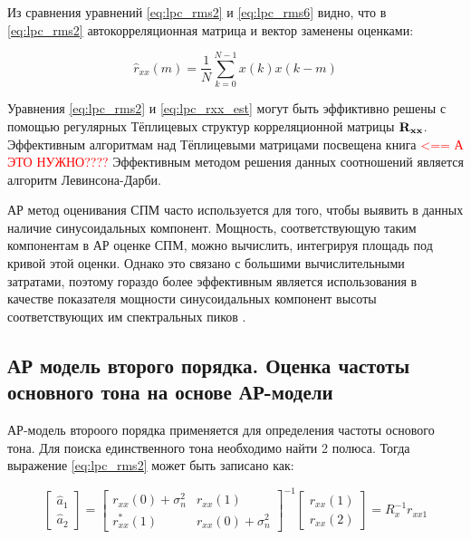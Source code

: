 Из сравнения уравнений \ref{eq:lpc_rms2} и \ref{eq:lpc_rms6} видно, что в \ref{eq:lpc_rms2}
автокорреляционная матрица и вектор заменены оценками:
\begin{center}
\begin{equation}
	\label{eq:lpc_rxx_est}
	\hat{r}_{xx}(m) = \frac{1}{N} \sum \limits_{k=0}^{N-1} x(k)x(k-m)
\end{equation}
\end{center}

Уравнения \ref{eq:lpc_rms2} и \ref{eq:lpc_rxx_est} могут быть эффиктивно решены с помощью регулярных
Тёплицевых структур корреляционной матрицы ${{\bf R_{xx}}}$. Эффективным алгоритмам над Тёплицевыми
матрицами посвещена книга \cite{bleyhut_book} \textcolor{red}{<== А ЭТО НУЖНО????} Эффективным методом решения
данных соотношений является алгоритм Левинсона-Дарби.

АР метод оценивания СПМ часто используется для того, чтобы выявить в данных наличие синусоидальных
компонент. Мощность, соответствующую  таким компонентам в АР оценке СПМ, можно вычислить, интегрируя
площадь под кривой этой оценки. Однако это связано с большими вычислительными затратами, поэтому
гораздо более эффективным является использования в качестве показателя мощности синусоидальных
компонент высоты соответствующих им спектральных пиков \cite{marpl_book}.  

\subsection{АР модель второго порядка. Оценка частоты основного тона на основе АР-модели}
АР-модель второого порядка применяется для определения частоты основого тона. Для поиска единственного
тона необходимо найти 2 полюса. Тогда выражение \ref{eq:lpc_rms2} может быть записано как:

\begin{center}
\begin{equation}
	\label{eq:lpc_gps_1}
	\left[ \begin{array}{c}
		\hat{a}_1 \\
		\hat{a}_2
	\end{array} \right]
	=
		\left[ \begin{array}{cc}
			r_{xx}(0)  + \sigma_n^2 & r_{xx}(1)\\
			r_{xx}^*(1) & r_{xx}(0) + \sigma_n^2 
		\end{array} \right]^{-1}
		\left[ \begin{array}{c}
			r_{xx}(1) \\
			r_{xx}(2)
		\end{array} \right]
	= R_x^{-1}r_{xx1}
\end{equation}
\end{center}

